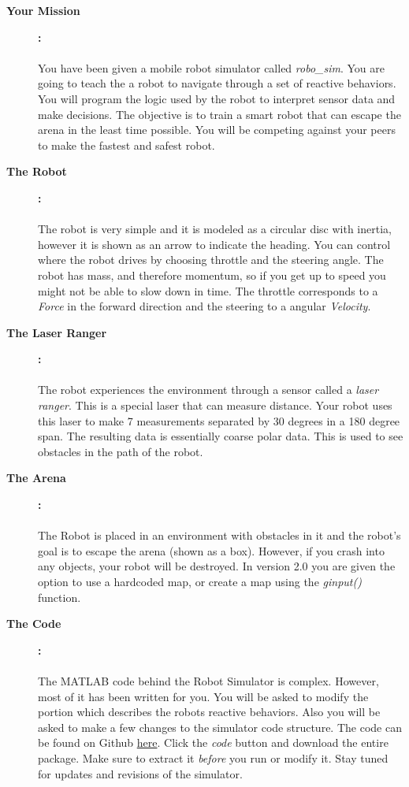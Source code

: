 \documentclass[11pt]{article}
\newcommand{\VER}{2.0 }
\begin{document}
	\begin{description}
		
		\item [\textbf{Your Mission}]\textbf{:} \\\\
		You have been given a mobile robot simulator called {\it robo\_sim}. You are going to teach the a robot to navigate through a set of reactive behaviors. You will program the logic used by the robot to interpret sensor data and make decisions. The objective is to train a smart robot that can escape the arena in the least time possible. You will be competing against your peers to make the fastest and safest robot.    

		\item [\textbf{The Robot}]\textbf{:} \\\\
		The robot is very simple and it is modeled as a circular disc with inertia, however it is shown as an arrow to indicate the heading. You can control where the robot drives by choosing throttle and the steering angle. The robot has mass, and therefore momentum, so if you get up to speed you might not be able to slow down in time. The throttle corresponds to a {\it Force} in the forward direction and the steering to a angular {\it Velocity}. 

		\item [\textbf{The Laser Ranger}]\textbf{:} \\\\
		The robot experiences the environment through a sensor called a {\it laser ranger}. This is a special laser that can measure distance. Your robot uses this laser to make 7 measurements separated by 30 degrees in a 180  degree span. The resulting data is essentially coarse polar data. This is used to see obstacles in the path of the robot.			

		\item [\textbf{The Arena}]\textbf{:} \\\\
		The Robot is placed in an environment with obstacles in it and the robot's goal is to escape the arena (shown as a box). However, if you crash into any objects, your robot will be destroyed. In version \VER you are given the option to use a hardcoded map, or create a map using the {\it ginput()} function.
			
		\item [\textbf{The Code}]\textbf{:} \\\\
		The MATLAB code behind the Robot Simulator is complex. However, most of it has been written for you. You will be asked to modify the portion which describes the robots reactive behaviors. Also you will be asked to make a few changes to the simulator code structure. The code can be found on Github \href{https://github.com/thillRobot/robo\_sim}{here}. Click the {\it code} button and download the entire package. Make sure to extract it {\it before} you run or modify it. Stay tuned for updates and revisions of the simulator.


\end{description}
\end{document}
